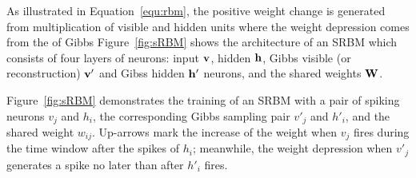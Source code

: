 As illustrated in Equation~\ref{equ:rbm}, the positive weight change is generated from multiplication of visible and hidden units where the weight depression comes from the \protect{} \protect{} of \protect{} Gibbs \protect{} \protect{}
Figure~\ref{fig:sRBM} shows the architecture of an SRBM which consists of four layers of neurons: input $\bf{v}$, hidden $\bf{h}$, Gibbs visible (or reconstruction) $\bf{v'}$ and Gibss hidden $\bf{h'}$ neurons, and the shared weights $\bf{W}$.

Figure~\ref{fig:sRBM} demonstrates the training of an SRBM with a pair of spiking neurons $v_j$ and $h_i$, the corresponding Gibbs sampling pair $v'_j$ and $h'_i$, and the shared weight $w_{ij}$.
Up-arrows mark the increase of the weight when $v_j$ fires during the time window after the spikes of $h_i$;
meanwhile, \protect{} \protect{}	 the weight depression when $v'_j$ generates a spike no later than \protect{} \protect{} after $h'_i$ fires.





